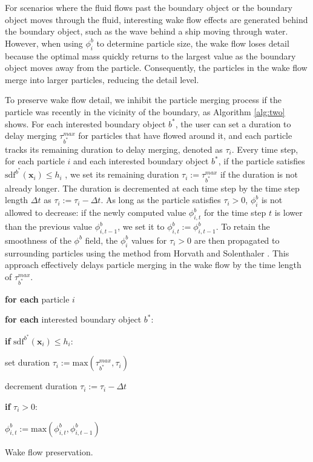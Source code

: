 \documentclass[VANCOUVER,STIX1COL]{WileyNJD-v2}
\begin{document}
For scenarios where the fluid flows past the boundary object or the boundary object moves through the fluid, interesting wake flow effects are generated behind the boundary object, such as the wave behind a ship moving through water. However, when using $\phi_i^b$ to determine particle size, the wake flow loses detail because the optimal mass quickly returns to the largest value as the boundary object moves away from the particle. Consequently, the particles in the wake flow merge into larger particles, reducing the detail level.

To preserve wake flow detail, we inhibit the particle merging process if the particle was recently in the vicinity of the boundary, as Algorithm \ref{alg:two} shows. For each interested boundary object $b^*$, the user can set a duration to delay merging $\tau^{max}_{b^*}$ for particles that have flowed around it, and each particle tracks its remaining duration to delay merging, denoted as $\tau_i$. Every time step, for each particle $i$ and each interested boundary object $b^*$, if the particle satisfies $\mathrm{sdf}^{b^*}(\mathbf{x}_i)\leq h_i$ , we set its remaining duration $\tau_i := \tau^{max}_{b^*}$ if the duration is not already longer. The duration is decremented at each time step by the time step length $\Delta t$ as $\tau_i:=\tau_i-\Delta t$. As long as the particle satisfies $\tau_i > 0$, $\phi^b_i$ is not allowed to decrease: if the newly computed value $\phi^{b}_{i,t}$ for the time step $t$ is lower than the previous value $\phi^{b}_{i,t-1}$, we set it to $\phi^{b}_{i,t} := \phi^{b}_{i,t-1}$. To retain the smoothness of the $\phi^b$ field, the $\phi^b_i$ values for $\tau_i > 0$ are then propagated to surrounding particles using the method from Horvath and Solenthaler \cite{Horvath13}. This approach effectively delays particle merging in the wake flow by the time length of $\tau^{max}_{b^*}$.

\vspace{-0.5\baselineskip}

\begin{algorithm}[htb]
\par\setlength\parindent{2em}
\noindent \textbf{for each} particle $i$ 

\textbf{for each} interested boundary object $b^*$:

\hspace{2em}\textbf{if} $\mathrm{sdf}^{b^*}(\mathbf{x}_i)\leq h_i$:

\hspace{2em}\hspace{2em}set duration $\tau_i:=\mathrm{max}(\tau_{b^*}^{max},\tau_i)$
    
decrement duration $\tau_i:=\tau_i-\Delta t$
    
\textbf{if} $\tau_i>0$:
    
\hspace{2em}$\phi_{i,t}^b:=\mathrm{max}(\phi_{i,t}^b,\phi_{i,t-1}^b)$

\caption{Wake flow preservation.}
\label{alg:two}
\end{algorithm}
\end{document}
